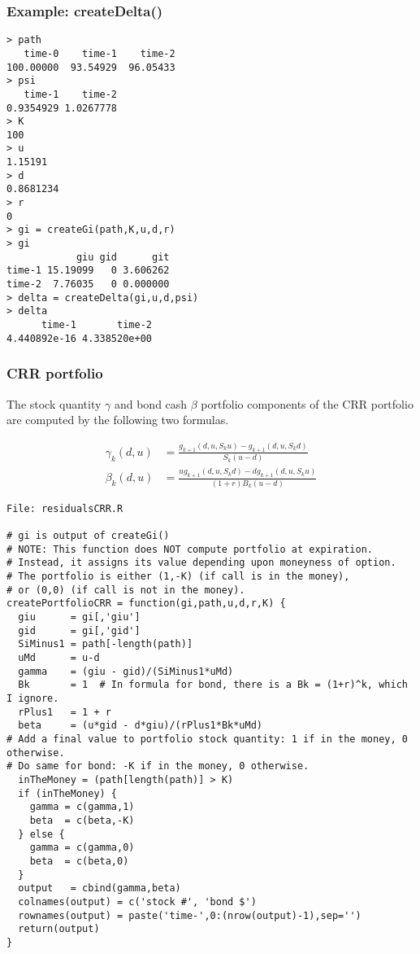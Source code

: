 \documentclass[10pt]{article}
\begin{document}
\subsubsection*{Example: createDelta()}

\begin{verbatim}
> path
   time-0    time-1    time-2
100.00000  93.54929  96.05433
> psi
   time-1    time-2
0.9354929 1.0267778
> K
100
> u
1.15191
> d
0.8681234
> r
0
> gi = createGi(path,K,u,d,r)
> gi
            giu gid      git
time-1 15.19099   0 3.606262
time-2  7.76035   0 0.000000
> delta = createDelta(gi,u,d,psi)
> delta
      time-1       time-2
4.440892e-16 4.338520e+00
\end{verbatim}


\subsubsection*{CRR  portfolio}

The stock quantity $\gamma$ and bond cash $\beta$ portfolio components of the CRR portfolio
are computed by the following two formulas.

\begin{align*}
    \gamma_k(d,u) &= \frac{g_{k+1}(d,u,S_k u) - g_{k+1}(d,u,S_kd)}{S_k(u-d)}\\
    \beta_k(d,u) &= \frac{u g_{k+1}(d,u,S_k d) - d g_{k+1}(d,u,S_k u)}{(1+r)B_k(u-d)}
\end{align*}


\begin{verbatim}
File: residualsCRR.R

# gi is output of createGi()
# NOTE: This function does NOT compute portfolio at expiration.
# Instead, it assigns its value depending upon moneyness of option.
# The portfolio is either (1,-K) (if call is in the money),
# or (0,0) (if call is not in the money).
createPortfolioCRR = function(gi,path,u,d,r,K) {
  giu      = gi[,'giu']
  gid      = gi[,'gid']
  SiMinus1 = path[-length(path)]
  uMd      = u-d
  gamma    = (giu - gid)/(SiMinus1*uMd)
  Bk       = 1  # In formula for bond, there is a Bk = (1+r)^k, which I ignore.
  rPlus1   = 1 + r
  beta     = (u*gid - d*giu)/(rPlus1*Bk*uMd)
# Add a final value to portfolio stock quantity: 1 if in the money, 0 otherwise.
# Do same for bond: -K if in the money, 0 otherwise.
  inTheMoney = (path[length(path)] > K)
  if (inTheMoney) {
    gamma = c(gamma,1)
    beta  = c(beta,-K)
  } else {
    gamma = c(gamma,0)
    beta  = c(beta,0)
  }
  output   = cbind(gamma,beta)
  colnames(output) = c('stock #', 'bond $')
  rownames(output) = paste('time-',0:(nrow(output)-1),sep='')
  return(output)
}
\end{verbatim}
\end{document}
